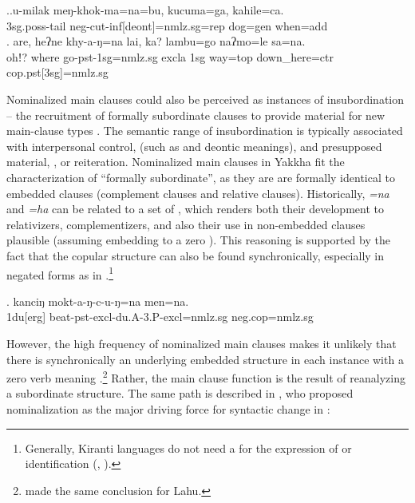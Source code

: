  
\ex.\ag.u-milak          meŋ-khok-ma=na=bu,                       kucuma=ga,   kahile=ca.\\
{\sc 3sg.poss-}tail  {\sc neg-}cut{\sc -inf[deont]=nmlz.sg=rep}  dog{\sc =gen} when{\sc =add}\\
\bg. are,   heʔne khy-a-ŋ=na lai,        ka? lambu=go     naʔmo=le             sa=na.\\
ohǃ?  where  go{\sc -pst-1sg=nmlz.sg} {\sc excla} {\sc 1sg} way{\sc =top} down\_here{\sc =ctr} {\sc cop.pst[3sg]=nmlz.sg}\\



Nominalized main clauses could also be perceived as instances of insubordination – the  recruitment of formally subordinate clauses to provide material for new main-clause types \citep{Evans2007_Insubordination}. The semantic range of insubordination is typically associated with interpersonal control,  (such as  and deontic meanings), and presupposed material, , or reiteration. Nominalized main clauses in Yakkha fit the characterization of “formally subordinate”, as they are are formally identical to embedded clauses (complement clauses and relative clauses). 
Historically,   \emph{=na} and \emph{=ha} can be related to a set of , which renders both their development to relativizers, complementizers, and also their use in  non-embedded  clauses plausible (assuming embedding to a zero ). This reasoning is supported by the fact that the copular structure can also be found synchronically, especially in negated forms as in \Next.\footnote{Generally,  Kiranti languages do not need a  for the expression of  or identification (\citet[276]{Bickel1999Nominalization}, \citealt[105]{Ebert1994The-structure}).}  

 \exg. kanciŋ  mokt-a-ŋ-c-u-ŋ=na  men=na.\\
{\sc 1du[erg]} beat{\sc -pst-excl-du.A-3.P-excl=nmlz.sg} {\sc neg.cop=nmlz.sg}\\
  
 

However, the high frequency of nominalized main clauses makes it unlikely that there is synchronically an underlying embedded structure in each instance with a zero verb meaning .\footnote{\citet{Matisoff1972Lahu} made the same conclusion for Lahu.} Rather, the main clause function is the result of reanalyzing a subordinate structure. The same path is described in \citet{DeLancey2011_Finite}, who proposed nominalization as the major driving force for syntactic change in : 
 
